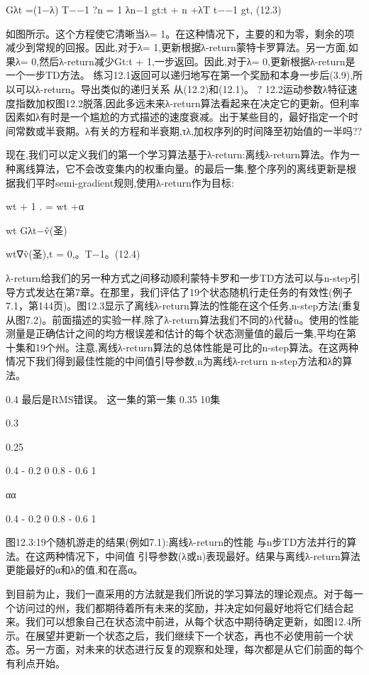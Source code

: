 Gλt =(1−λ)
T−−1 ?n = 1
λn−1 gt:t + n +λT t−−1 gt, 					(12.3)

如图所示。这个方程使它清晰当λ= 1。在这种情况下，主要的和为零，剩余的项减少到常规的回报。因此,对于λ= 1,更新根据λ-return蒙特卡罗算法。另一方面,如果λ= 0,然后λ-return减少Gt:t + 1,一步返回。因此,对于λ= 0,更新根据λ-return是一个一步TD方法。
练习12.1返回可以递归地写在第一个奖励和本身一步后(3.9),所以可以λ-return。导出类似的递归关系
从(12.2)和(12.1)。 					?
12.2运动参数λ特征速度指数加权图12.2脱落,因此多远未来λ-return算法看起来在决定它的更新。但利率因素如λ有时是一个尴尬的方式描述的速度衰减。出于某些目的，最好指定一个时间常数或半衰期。λ有关的方程和半衰期,τλ,加权序列的时间降至初始值的一半吗??

现在,我们可以定义我们的第一个学习算法基于λ-return:离线λ-return算法。作为一种离线算法，它不会改变集内的权重向量。的最后一集,整个序列的离线更新是根据我们平时semi-gradient规则,使用λ-return作为目标:


wt + 1
.
= wt +α

wt Gλt−v̂(圣)

wt∇v̂(圣),t = 0,。T−1。(12.4)

λ-return给我们的另一种方式之间移动顺利蒙特卡罗和一步TD方法可以与n-step引导方式发达在第7章。在那里，我们评估了19个状态随机行走任务的有效性(例子7.1，第144页)。图12.3显示了离线λ-return算法的性能在这个任务,n-step方法(重复从图7.2)。前面描述的实验一样,除了λ-return算法我们不同的λ代替n。使用的性能测量是正确估计之间的均方根误差和估计的每个状态测量值的最后一集,平均在第十集和19个州。注意,离线λ-return算法的总体性能是可比的n-step算法。在这两种情况下我们得到最佳性能的中间值引导参数,n为离线λ-return n-step方法和λ的算法。

0.4
最后是RMS错误。
这一集的第一集
0.35 10集

0.3



0.25

0.4 - 0.2 0 					0.8 - 0.6 					1

αα
 
0.4 - 0.2 0 					0.8 - 0.6 					1




图12.3:19个随机游走的结果(例如7.1):离线λ-return的性能
与n步TD方法并行的算法。在这两种情况下，中间值
引导参数(λ或n)表现最好。结果与离线λ-return算法
更能最好的α和λ的值,和在高α。



到目前为止，我们一直采用的方法就是我们所说的学习算法的理论观点。对于每一个访问过的州，我们都期待着所有未来的奖励，并决定如何最好地将它们结合起来。我们可以想象自己在状态流中前进，从每个状态中期待确定更新，如图12.4所示。在展望并更新一个状态之后，我们继续下一个状态，再也不必使用前一个状态。另一方面，对未来的状态进行反复的观察和处理，每次都是从它们前面的每个有利点开始。

